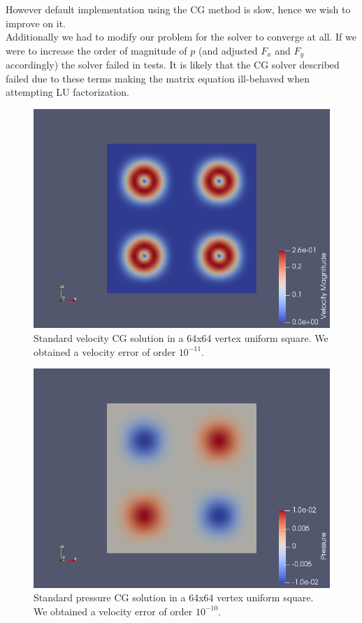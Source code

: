 \documentclass[11pt,twoside,a4paper]{article}
\begin{document}
However default implementation using the CG method is slow, hence we wish to improve on it.\\
Additionally we had to modify our problem for the solver to converge at all. If we were to increase the order of magnitude of $p$ (and adjusted $F_x$ and $F_y$ accordingly) the solver failed in tests. It is likely that the CG solver described failed due to these terms making the matrix equation ill-behaved  when attempting LU factorization.
\begin{figure}
  \includegraphics[width=\linewidth]{lgv.png}
  \caption{Standard velocity CG solution in a 64x64 vertex uniform square. We obtained a velocity error of order $10^{-11}$.}
\end{figure}
\begin{figure}
  \includegraphics[width=\linewidth]{lgp.png}
  \caption{Standard pressure CG solution in a 64x64 vertex uniform square. We obtained a velocity error of order $10^{-10}$.}
\end{figure}
\end{document}
